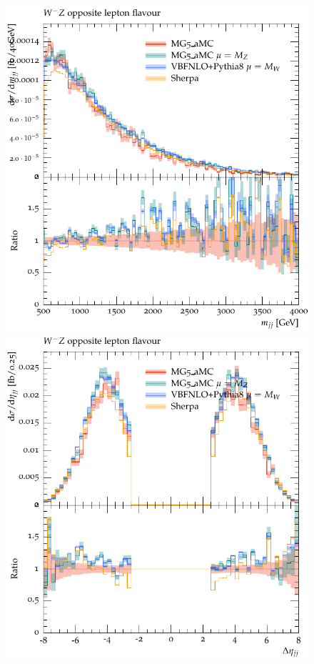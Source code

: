 \documentclass[11pt]{cernrep}
\begin{document}
\begin{figure}[htbp]
\begin{center}
   \includegraphics[scale=0.5]{figs/WmZ_OF_mjj}
   \includegraphics[scale=0.5]{figs/WmZ_OF_dEtajj}

\end{center}
\end{figure}
\end{document}
